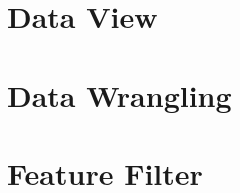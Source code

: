 \documentclass{book}
\begin{document}
\maketitle
\section{Data View}
\section{Data Wrangling}
\section{Feature Filter}

\end{document}
